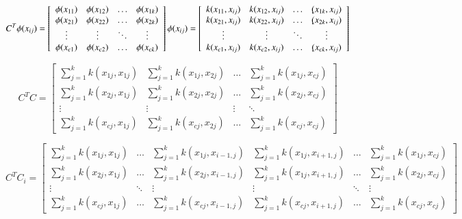 \documentclass[bachelor,zhspacing]{cqu}  %
\begin{document}
\[C^{T}\phi{(x_{ij})}=
        \left[
            \begin{array}{cccc}
                \phi{(x_{11})} & \phi{(x_{12})} & \ldots & \phi{(x_{1k})}\\
                \phi{(x_{21})} & \phi{(x_{22})} & \ldots & \phi{(x_{2k})}\\
                \vdots & \vdots & \ddots & \vdots\\
                \phi{(x_{c1})} & \phi{(x_{c2})} & \ldots & \phi{(x_{ck})}
            \end{array}
        \right]\phi{(x_{ij})}
        =\left[
            \begin{array}{cccc}
              k(x_{11},x_{ij}) & k(x_{12},x_{ij}) & \ldots &\k(x_{1k},x_{ij}) \\
              k(x_{21},x_{ij}) & k(x_{22},x_{ij}) & \ldots &\k(x_{2k},x_{ij}) \\
              \vdots & \vdots & \ddots & \vdots \\
              k(x_{c1},x_{ij}) & k(x_{c2},x_{ij}) & \ldots &\k(x_{ck},x_{ij}) 
            \end{array}
         \right]\]

\[C^{T}C=
        \left[
            \begin{array}{cccc}
                \sum_{j=1}^{k}k(x_{1j},x_{1j}) & \sum_{j=1}^{k}k(x_{1j},x_{2j}) & \ldots & \sum_{j=1}^{k}k(x_{1j},x_{cj}) \\
                \sum_{j=1}^{k}k(x_{2j},x_{1j}) & \sum_{j=1}^{k}k(x_{2j},x_{2j}) & \ldots & \sum_{j=1}^{k}k(x_{2j},x_{cj}) \\
                \vdots & \vdots & \vdots & \ddots \\
                \sum_{j=1}^{k}k(x_{cj},x_{1j}) & \sum_{j=1}^{k}k(x_{cj},x_{2j}) & \ldots & \sum_{j=1}^{k}k(x_{cj},x_{cj}) 
            \end{array}
        \right]\]

\[C^{T}C_{i}=
        \left[
            \begin{array}{cccccc}
                \sum_{j=1}^{k}k(x_{1j},x_{1j}) & \ldots & \sum_{j=1}^{k}k(x_{1j},x_{i-1,j}) & \sum_{j=1}^{k}k(x_{1j},x_{i+1,j}) &\ldots & \sum_{j=1}^{k}k(x_{1j},x_{cj}) \\
                \sum_{j=1}^{k}k(x_{2j},x_{1j}) & \ldots & \sum_{j=1}^{k}k(x_{2j},x_{i-1,j}) & \sum_{j=1}^{k}k(x_{1j},x_{i+1,j}) &\ldots & \sum_{j=1}^{k}k(x_{2j},x_{cj}) \\
                \vdots & \ddots & \vdots & \vdots & \ddots & \vdots \\
                \sum_{j=1}^{k}k(x_{cj},x_{1j}) &\ldots & \sum_{j=1}^{k}k(x_{cj},x_{i-1,j}) & \sum_{j=1}^{k}k(x_{cj},x_{i+1,j}) &\ldots & \sum_{j=1}^{k}k(x_{cj},x_{cj}) 
            \end{array}
        \right]\]
\end{document}
